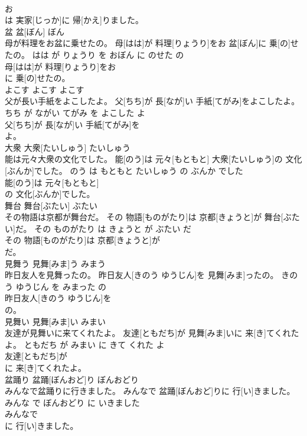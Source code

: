 \documentclass[8pt]{extreport}
\begin{document}
\begin{CJK}{UTF8}{min}
\\	お
\\	は 実家[じっか]に 帰[かえ]りました。			
\\	盆	盆[ぼん]	ぼん	
\\	母が料理をお盆に乗せたの。	母[はは]が 料理[りょうり]をお 盆[ぼん]に 乗[の]せたの。	はは が りょうり を おぼん に のせた の	
\\	母[はは]が 料理[りょうり]をお
\\	に 乗[の]せたの。			
\\	よこす	よこす	よこす	
\\	父が長い手紙をよこしたよ。	父[ちち]が 長[なが]い 手紙[てがみ]をよこしたよ。	ちち が ながい てがみ を よこした よ	
\\	父[ちち]が 長[なが]い 手紙[てがみ]を
\\	よ。			
\\	大衆	大衆[たいしゅう]	たいしゅう	
\\	能は元々大衆の文化でした。	能[のう]は 元々[もともと] 大衆[たいしゅう]の 文化[ぶんか]でした。	のう は もともと たいしゅう の ぶんか でした	
\\	能[のう]は 元々[もともと]
\\	の 文化[ぶんか]でした。			
\\	舞台	舞台[ぶたい]	ぶたい	
\\	その物語は京都が舞台だ。	その 物語[ものがたり]は 京都[きょうと]が 舞台[ぶたい]だ。	その ものがたり は きょうと が ぶたい だ	
\\	その 物語[ものがたり]は 京都[きょうと]が
\\	だ。			
\\	見舞う	見舞[みま]う	みまう	
\\	昨日友人を見舞ったの。	昨日友人[きのう ゆうじん]を 見舞[みま]ったの。	きのう ゆうじん を みまった の	
\\	昨日友人[きのう ゆうじん]を
\\	の。			
\\	見舞い	見舞[みま]い	みまい	
\\	友達が見舞いに来てくれたよ。	友達[ともだち]が 見舞[みま]いに 来[き]てくれたよ。	ともだち が みまい に きて くれた よ	
\\	友達[ともだち]が
\\	に 来[き]てくれたよ。			
\\	盆踊り	盆踊[ぼんおど]り	ぼんおどり	
\\	みんなで盆踊りに行きました。	みんなで 盆踊[ぼんおど]りに 行[い]きました。	みんな で ぼんおどり に いきました	
\\	みんなで
\\	に 行[い]きました。			

\end{CJK}
\end{document}
